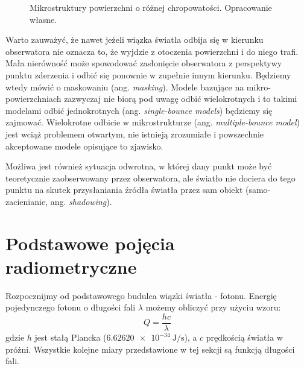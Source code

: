 \documentclass[../main.tex]{subfiles}
\begin{document}
\begin{figure}[ht]
  \centering
  \hspace{0.5cm}
  \vspace{0.25cm}
  \caption{Mikrostruktury powierzchni o różnej chropowatości. Opracowanie własne.}
	\label{fig:Microstructure}
\end{figure}

Warto zauważyć, że nawet jeżeli wiązka światła odbija się w kierunku obserwatora nie oznacza to, że wyjdzie z otoczenia powierzchni i do niego trafi. Mała nierówność może spowodować zasłonięcie obserwatora z perspektywy punktu zderzenia i odbić się ponownie w zupełnie innym kierunku. Będziemy wtedy mówić o maskowaniu (ang. \textit{masking}). Modele bazujące na mikro-powierzchniach zazwyczaj nie biorą pod uwagę odbić wielokrotnych i to takimi modelami odbić jednokrotnych (ang. \textit{single-bounce models}) będziemy się zajmować. Wielokrotne odbicie w mikrostrukturze (ang. \textit{multiple-bounce model}) jest wciąż problemem otwartym, nie istnieją zrozumiałe i powszechnie akceptowane modele opisujące to zjawisko.

Możliwa jest również sytuacja odwrotna, w której dany punkt może być teoretycznie zaobserwowany przez obserwatora, ale światło nie dociera do tego punktu na skutek przysłaniania źródła światła przez sam obiekt (samo-zacienianie, ang. \textit{shadowing}).


\section{Podstawowe pojęcia radiometryczne}

Rozpocznijmy od podstawowego budulca wiązki światła - fotonu. Energię pojedynczego fotonu o długości fali $\lambda$ możemy obliczyć przy użyciu wzoru:
\[ 
    Q = \frac{hc}{\lambda} 
\]
\noindent gdzie $h$ jest stałą Plancka ($\SI{6.62620e-34}{\joule\per\second}$), a $c$ prędkością światła w próżni. Wszystkie kolejne miary przedstawione w tej sekcji są funkcją długości fali.
\end{document}
